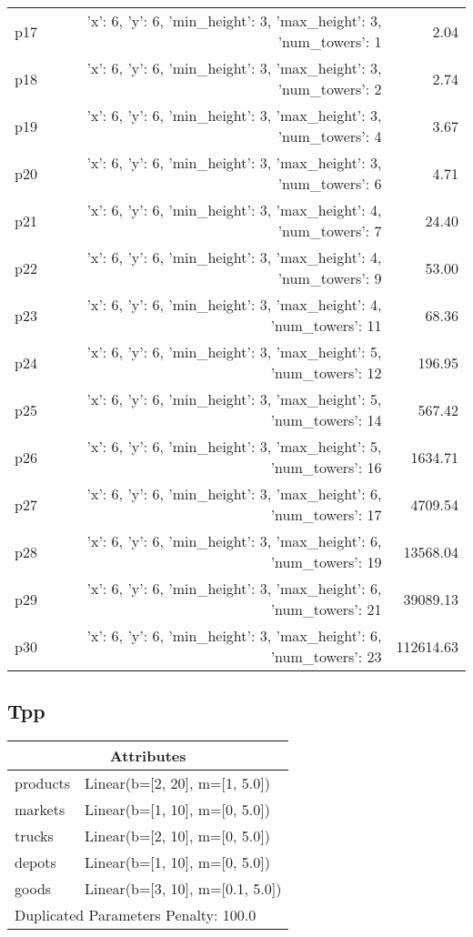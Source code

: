 \documentclass{article}
\begin{document}
\begin{center}
\begin{tabular}{@{}l|r|r@{}}
  p17&{'x': 6, 'y': 6, 'min\_height': 3, 'max\_height': 3, 'num\_towers': 1}&2.04\\
  p18&{'x': 6, 'y': 6, 'min\_height': 3, 'max\_height': 3, 'num\_towers': 2}&2.74\\
  p19&{'x': 6, 'y': 6, 'min\_height': 3, 'max\_height': 3, 'num\_towers': 4}&3.67\\
  p20&{'x': 6, 'y': 6, 'min\_height': 3, 'max\_height': 3, 'num\_towers': 6}&4.71\\
  p21&{'x': 6, 'y': 6, 'min\_height': 3, 'max\_height': 4, 'num\_towers': 7}&24.40\\
  p22&{'x': 6, 'y': 6, 'min\_height': 3, 'max\_height': 4, 'num\_towers': 9}&53.00\\
  p23&{'x': 6, 'y': 6, 'min\_height': 3, 'max\_height': 4, 'num\_towers': 11}&68.36\\
  p24&{'x': 6, 'y': 6, 'min\_height': 3, 'max\_height': 5, 'num\_towers': 12}&196.95\\
  p25&{'x': 6, 'y': 6, 'min\_height': 3, 'max\_height': 5, 'num\_towers': 14}&567.42\\
  p26&{'x': 6, 'y': 6, 'min\_height': 3, 'max\_height': 5, 'num\_towers': 16}&1634.71\\
  p27&{'x': 6, 'y': 6, 'min\_height': 3, 'max\_height': 6, 'num\_towers': 17}&4709.54\\
  p28&{'x': 6, 'y': 6, 'min\_height': 3, 'max\_height': 6, 'num\_towers': 19}&13568.04\\
  p29&{'x': 6, 'y': 6, 'min\_height': 3, 'max\_height': 6, 'num\_towers': 21}&39089.13\\
  p30&{'x': 6, 'y': 6, 'min\_height': 3, 'max\_height': 6, 'num\_towers': 23}&112614.63
                            \end{tabular}
                            \end{center}
                    
                            \newpage \subsection{Tpp}
                    \begin{center}
                    \begin{tabular}{@{}p{}p{}@{}}
                    \multicolumn{2}{c}{\bf \large Attributes}\\\midrule
                    products & Linear(b=[2, 20], m=[1, 5.0])\\
markets & Linear(b=[1, 10], m=[0, 5.0])\\
trucks & Linear(b=[2, 10], m=[0, 5.0])\\
depots & Linear(b=[1, 10], m=[0, 5.0])\\
goods & Linear(b=[3, 10], m=[0.1, 5.0]) \\\midrule
                    \multicolumn{2}{l}{Duplicated Parameters Penalty: 100.0}
                    \end{tabular}
                    \end{center}
                
\end{document}

